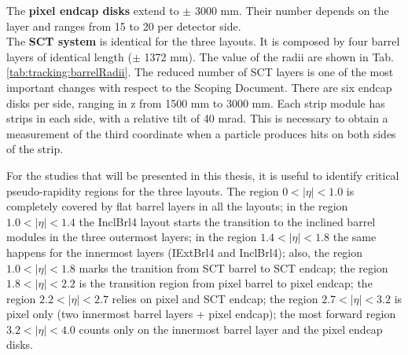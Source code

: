 \documentclass[a4paper,twoside,12pt]{book}
\begin{document}
The \textbf{pixel endcap disks} extend to $\pm$ 3000 mm. Their 
number depends on the layer and ranges from 15 to 20 per detector side. \\

The \textbf{SCT system} is identical for the three layouts. It is composed by four barrel layers of identical length ($\pm$ 1372 mm). The value of the radii are shown in Tab.
\ref{tab:tracking:barrelRadii}. The reduced number of SCT layers is one of the most important changes
with respect to the Scoping Document\cite{scoping}. There
are six endcap disks per side, ranging in z from 1500 mm to 3000 mm. Each strip module
has strips in each side, with a relative tilt of 40 mrad. This is necessary to obtain a
measurement of the third coordinate when a particle produces hits on both sides of the
strip.\\

\begin{table} [h]
\centering
	\caption{For the three Step-1 layouts considered, values of the barrel layers radii in the Pixel and SCT layers. The second pixel layer is 75 mm only for the ExtBrl4 layout, and is 
	85 mm in the IExtBrl4 and InclBrl4 layouts.}
	\label{tab:tracking:barrelRadii}
\end{table}

For the studies that will be presented in this thesis, it is useful to identify critical pseudo-rapidity regions for the three layouts. The region $0 < |\eta| < 1.0$ is completely covered by
flat barrel layers in all the layouts; in the region $1.0 < |\eta| < 1.4$ the InclBrl4 layout starts the transition to the inclined barrel modules in the three outermost layers; in the
region $1.4 < |\eta| < 1.8$ the same happens for the innermost layers (IExtBrl4 and InclBrl4); also, the region $1.0 < |\eta| < 1.8$ marks the tranition from SCT barrel to SCT endcap; the region $1.8 < |\eta| < 2.2$ is the transition region from pixel barrel to pixel endcap; the region $2.2 < |\eta| < 2.7$ relies on pixel and SCT endcap; the region $2.7 < |\eta| < 3.2$  is pixel only (two innermost barrel layers + pixel endcap); the most forward region $3.2 < |\eta| < 4.0$ counts only on the innermost barrel layer and the pixel endcap disks.\\
\end{document}
